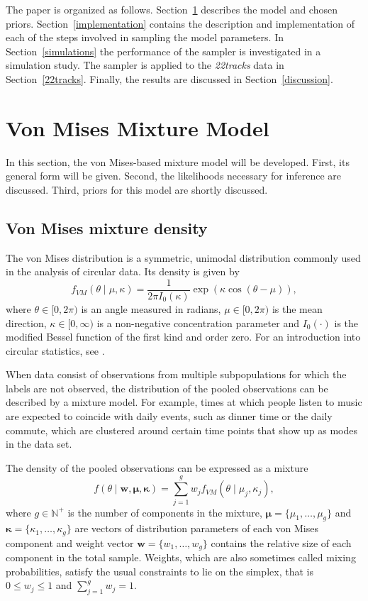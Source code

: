 The paper is organized as follows. Section~\ref{design} describes the model and chosen priors. Section~\ref{implementation} contains the description and implementation of each of the steps involved in sampling the model parameters. In Section~\ref{simulations} the performance of the sampler is investigated in a simulation study. The sampler is applied to the \textit{22tracks} data in Section~\ref{22tracks}. Finally, the results are discussed in Section~\ref{discussion}.


\section{Von Mises Mixture Model}
\label{design}

In this section, the von Mises-based mixture model will be developed. First, its general form will be given. Second, the likelihoods necessary for inference are discussed. Third, priors for this model are shortly discussed. 

\subsection{Von Mises mixture density}

The von Mises distribution is a symmetric, unimodal distribution commonly used in the analysis of circular data. Its density is given by
\begin{equation}
f_{VM}(\theta\mid\mu,\kappa) = \frac{1}{2\pi I_0(\kappa)} \exp({\kappa\cos(\theta-\mu)}),
\end{equation}
where $\theta \in \mathopen[ 0, 2\pi \mathclose)$ is an angle measured in radians, $\mu \in \mathopen[ 0, 2\pi \mathclose)$ is the mean direction, $\kappa \in \mathopen[ 0, \infty \mathclose)$ is a non-negative concentration parameter and $I_0(\cdot)$ is the modified Bessel function of the first kind and order zero. For an introduction into circular statistics, see \citep{Mardia2009}.

When data consist of observations from multiple subpopulations for which the labels are not observed, the distribution of the pooled observations can be described by a mixture model. For example, times at which people listen to music are expected to coincide with daily events, such as dinner time or the daily commute, which are clustered around certain time points that show up as modes in the data set. 

The density of the pooled observations can be expressed as a mixture
\begin{equation}
f(\theta\mid\bm{w},\bm{\mu},\bm{\kappa}) = \sum_{j=1}^{g} w_j f_{VM}(\theta\mid\mu_j,\kappa_j),
\end{equation}
where $g \in \mathbb{N}^+$ is the number of components in the mixture, $\bm{\mu}=\{\mu_1,\dotsc,\mu_g\}$ and $\bm{\kappa}=\{\kappa_1,\dotsc,\kappa_g\}$ are vectors of distribution parameters of each von Mises component and weight vector $\bm{w}=\{w_1,\dotsc,w_g\}$ contains the relative size of each component in the total sample. Weights, which are also sometimes called mixing probabilities, satisfy the usual constraints to lie on the simplex, that is $0 \leq w_j \leq 1$ and $\sum^{g}_{j=1}w_j=1$. 


